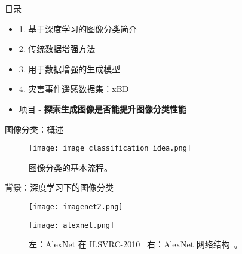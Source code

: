 
\begin{refsection}
    \begin{frame}{目录}
      \begin{itemize}
        \item 1. 基于深度学习的图像分类简介
        \item 2. 传统数据增强方法
        \item 3. 用于数据增强的生成模型
        \item 4. 灾害事件遥感数据集：xBD
      \end{itemize}
      \begin{itemize}
        \item 项目 - \textbf{探索生成图像是否能提升图像分类性能}
      \end{itemize}
    \end{frame}
\end{refsection}


\begin{refsection}
  \begin{frame}{图像分类：概述}
    \begin{figure}
      \centering
      \texttt{[image: image\_classification\_idea.png]}
      \caption{\scriptsize 图像分类的基本流程。}
    \end{figure}
    \bottomleftrefs
  \end{frame}
\end{refsection}

\begin{refsection}
  \begin{frame}{背景：深度学习下的图像分类}
    \begin{figure}
      \centering
      \begin{minipage}{0.48\linewidth}
        \centering
        \texttt{[image: imagenet2.png]}
      \end{minipage}\hfill
      \begin{minipage}{0.48\linewidth}
        \centering
        \texttt{[image: alexnet.png]}
      \end{minipage}
      \caption[]{\scriptsize 左：AlexNet 在 ILSVRC-2010~\parencite{imagenet2010challenge} \quad 右：AlexNet 网络结构~\parencite{krizhevskyImageNetClassificationDeep2012}。}
    \end{figure}
    \bottomleftrefs
  \end{frame}
\end{refsection}

